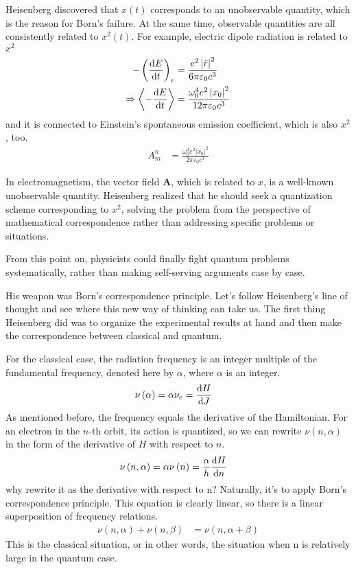 \documentclass[a4paper, 12pt, oneside, onecolumn]{article}
\newcommand{\cald}{{\rm d}}
\begin{document}
\begin{multicols}{2}
Heisenberg discovered that $x \left(t \right)$ corresponds to an unobservable quantity, which is the reason for Born's failure. At the same time, observable quantities are all consistently related to $x^2 \left(t \right)$. For example, electric dipole radiation is related to $x^2$
\begin{align}
	- \left( \frac{\cald E}{\cald t} \right)_r
	&= \frac{e^2 \left| \ddot r \right|^2 }{6 \pi \varepsilon_0 c^3} \\
	\Rightarrow \left<- \frac{\cald E}{\cald t} \right>
	&= \frac{\omega_0^4 e^2 \left| x_0 \right|^2}{12 \pi \varepsilon_0 c^3}
\end{align}
and it is connected to Einstein's spontaneous emission coefficient, which is also $x^2$, too.
\begin{align}
	A_m^n
	&= \frac{\omega_0^3 e^2 \left| x_0 \right|^2}{2 \pi \varepsilon_0 c^3}
\end{align}

In electromagnetism, the vector field $\bm{A}$, which is related to $x$, is a well-known unobservable quantity.
Heisenberg realized that he should seek a quantization scheme corresponding to $x^2$, solving the problem from the perspective of mathematical correspondence rather than addressing specific problems or situations.

From this point on, physicists could finally fight quantum problems systematically, rather than making self-serving arguments case by case.

His weapon was Born's correspondence principle. Let's follow Heisenberg's line of thought and see where this new way of thinking can take us. The first thing Heisenberg did was to organize the experimental results at hand and then make the correspondence between classical and quantum.

For the classical case, the radiation frequency is an integer multiple of the fundamental frequency, denoted here by $\alpha$, where $\alpha$ is an integer.
\begin{align}
	\nu \left( \alpha \right)
	&= \alpha \nu_e = \frac{\cald H}{\cald J}
\end{align}
As mentioned before, the frequency equals the derivative of the Hamiltonian. For an electron in the $n$-th orbit, its action is quantized, so we can rewrite $\nu \left( n, \alpha \right) $ in the form of the derivative of $H$ with respect to $n$.
\begin{align}
	\nu \left( n, \alpha \right)
	&= \alpha \nu \left( n \right) = \frac{\alpha}{h} \frac{\cald H}{\cald n}
\end{align}
why rewrite it as the derivative with respect to n? Naturally, it's to apply Born's correspondence principle. This equation is clearly linear, so there is a linear superposition of frequency relations.
\begin{align}
	\nu \left( n, \alpha \right) + \nu \left( n, \beta \right)
	&= \nu \left( n, \alpha + \beta \right)
\end{align}
This is the classical situation, or in other words, the situation when n is relatively large in the quantum case. 


\end{multicols}
\end{document}
